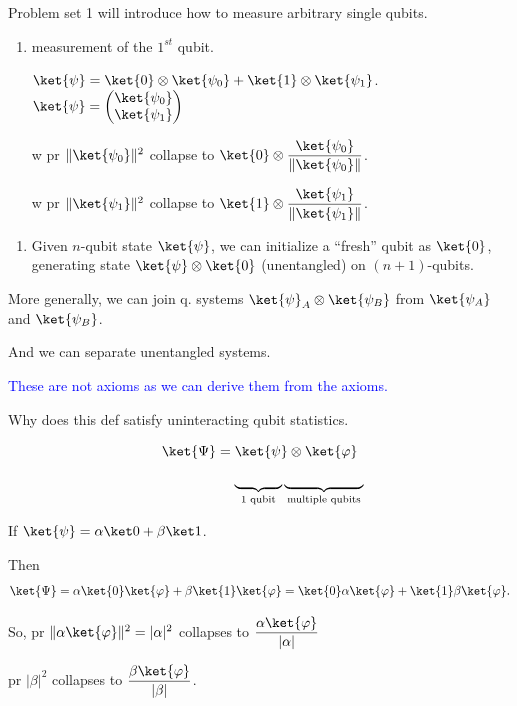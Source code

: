 \documentclass[11pt]{article}
\begin{document}
Problem set 1 will introduce how to measure arbitrary single qubits.

\begin{enumerate}
    \item[\textcircled{3}$'$] measurement of the $1^{st}$ qubit.

    $\ket{\psi} = \ket{0}\otimes\ket{\psi_0} + \ket{1}\otimes\ket{\psi_1}$. \hfill $\ket{\psi} = \begin{pmatrix}\ket{\psi_0}\\\ket{\psi_1}\end{pmatrix}$

    w pr $\|\ket{\psi_0}\|^2$ collapse to $\ket{0}\otimes\dfrac{\ket{\psi_0}}{\|\ket{\psi_0}\|}$.

    w pr $\|\ket{\psi_1}\|^2$ collapse to $\ket{1}\otimes\dfrac{\ket{\psi_1}}{\|\ket{\psi_1}\|}$.
\end{enumerate}

\begin{enumerate}
    \item[\textcircled{4}] Given $n$-qubit state $\ket{\psi}$, we can initialize a ``fresh'' qubit as $\ket{0}$, generating state $\ket{\psi}\otimes\ket{0}$ (unentangled) on $(n+1)$-qubits.
\end{enumerate}

More generally, we can join q. systems $\ket{\psi}_A \otimes \ket{\psi_B}$ from $\ket{\psi_A}$ and $\ket{\psi_B}$.

And we can separate unentangled systems.

\textcolor{blue}{These are not axioms as we can derive them from the axioms.}

Why does this def satisfy uninteracting qubit statistics.

\[
\ket{\Psi} = \ket{\psi}\otimes\ket{\varphi}
\]
\[
\hspace{2cm}\underbrace{\hspace{1.2cm}}_{1\text{ qubit}}\underbrace{\hspace{2cm}}_{\text{multiple qubits}}
\]

If $\ket{\psi} = \alpha\ket0 + \beta\ket1$.

Then
\[
\ket{\Psi} = \alpha\ket{0}\ket{\varphi} + \beta\ket{1}\ket{\varphi} = \ket{0}\alpha\ket{\varphi} + \ket{1}\beta\ket{\varphi}.
\]

So, pr $\|\alpha\ket{\varphi}\|^2 = |\alpha|^2$ collapses to $\dfrac{\alpha\ket{\varphi}}{|\alpha|}$

pr $|\beta|^2$ collapses to $\dfrac{\beta\ket{\varphi}}{|\beta|}$.
\end{document}
